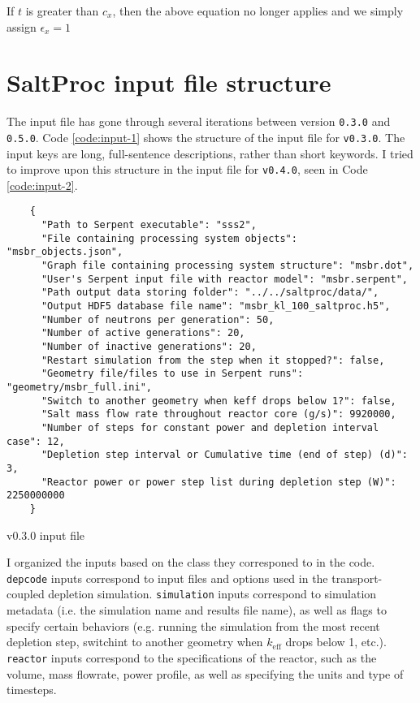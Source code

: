 If $t$ is greater than $c_{x}$, then the above equation no longer applies and we simply assign $\epsilon_{x} = 1$

\chapter{SaltProc input file structure}
\label{appex:input-files}

The \SaltProc input file has gone through several iterations between version
\verb,0.3.0, and \verb,0.5.0,. Code \ref{code:input-1} shows the structure
of the input file for \SaltProc \verb,v0.3.0,. The input keys are long,
full-sentence descriptions, rather than short keywords. I tried to improve upon
this structure in the input file for \SaltProc \verb,v0.4.0,, seen in
Code \ref{code:input-2}.

\begin{listing}[!ht]
    \begin{verbatim}
    {
      "Path to Serpent executable": "sss2",
      "File containing processing system objects": "msbr_objects.json",
      "Graph file containing processing system structure": "msbr.dot",
      "User's Serpent input file with reactor model": "msbr.serpent",
      "Path output data storing folder": "../../saltproc/data/",
      "Output HDF5 database file name": "msbr_kl_100_saltproc.h5",
      "Number of neutrons per generation": 50,
      "Number of active generations": 20,
      "Number of inactive generations": 20,
      "Restart simulation from the step when it stopped?": false,
      "Geometry file/files to use in Serpent runs": "geometry/msbr_full.ini",
      "Switch to another geometry when keff drops below 1?": false,
      "Salt mass flow rate throughout reactor core (g/s)": 9920000,
      "Number of steps for constant power and depletion interval case": 12,
      "Depletion step interval or Cumulative time (end of step) (d)": 3,
      "Reactor power or power step list during depletion step (W)": 2250000000
    }
    \end{verbatim}
    \caption{\SaltProc v0.3.0 input file}
    \label{code:input-1}
\end{listing}

I organized the inputs based on the class they corresponed to in the \SaltProc
code. \verb.depcode. inputs correspond to input files and options used in the
transport-coupled depletion simulation. \verb.simulation. inputs correspond to
simulation metadata (i.e. the simulation name and results file name), as well as
flags to specify certain behaviors (e.g. running the simulation from the most
recent depletion step, switchint to another geometry when $k_{\text{eff}}$ drops below
1, etc.). \verb.reactor. inputs correspond to the specifications of the reactor,
such as the volume, mass flowrate, power profile, as well as 
specifying the units and type of timesteps.

